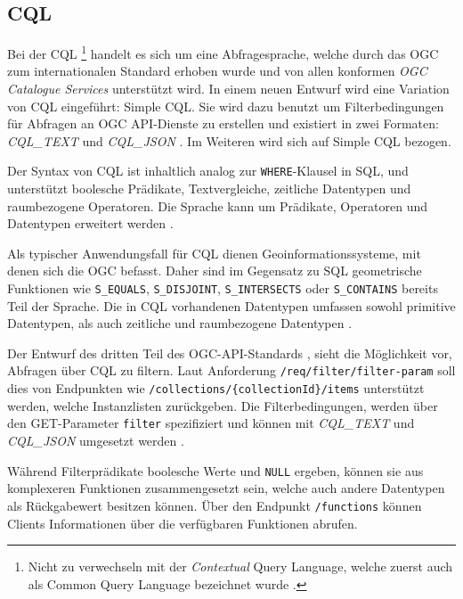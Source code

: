 \subsection{\acl{CQL}}

Bei der \acf{CQL} \footnote{Nicht zu verwechseln mit der \textit{Contextual} Query Language, welche zuerst auch als Common Query Language bezeichnet wurde \parencite{thelibraryofcongressCQLContextual2023, ZINGGentle2003}.} handelt es sich um eine Abfragesprache, welche durch das \ac{OGC} zum internationalen Standard erhoben wurde und von allen konformen \textit{\ac{OGC} Catalogue Services} unterstützt wird.  In einem neuen Entwurf  wird eine Variation von \ac{CQL} eingeführt: Simple \ac{CQL}. Sie wird dazu benutzt um Filterbedingungen für Abfragen an \ac{OGC} API-Dienste zu erstellen und existiert in zwei Formaten: \textit{CQL\_TEXT} und \textit{CQL\_JSON} . Im Weiteren wird sich auf Simple \ac{CQL} bezogen.

Der Syntax von \ac{CQL} ist inhaltlich analog zur \texttt{WHERE}-Klausel in \acs{SQL}, und unterstützt boolesche Prädikate, Textvergleiche, zeitliche Datentypen und raumbezogene Operatoren. Die Sprache kann um Prädikate, Operatoren und Datentypen erweitert werden .

Als typischer Anwendungsfall für \ac{CQL} dienen Geoinformationssysteme, mit denen sich die \ac{OGC} befasst. Daher sind im Gegensatz zu \ac{SQL} geometrische Funktionen wie \texttt{S\_EQUALS}, \texttt{S\_DISJOINT}, \texttt{S\_INTERSECTS} oder \texttt{S\_CONTAINS} bereits Teil der Sprache. Die in \ac{CQL} vorhandenen Datentypen umfassen sowohl primitive Datentypen, als auch zeitliche und raumbezogene Datentypen .

Der Entwurf des dritten Teil des OGC-API-Standards , sieht die Möglichkeit vor, Abfragen über \ac{CQL} zu filtern. Laut Anforderung \texttt{/req/filter/filter-param} soll dies von Endpunkten wie \texttt{/collections/\{collectionId\}/items} unterstützt werden, welche Instanzlisten zurückgeben. Die Filterbedingungen, werden über den GET-Parameter \texttt{filter} spezifiziert und können mit \textit{CQL\_TEXT} und \textit{CQL\_JSON} umgesetzt werden .

Während Filterprädikate boolesche Werte und \texttt{NULL} ergeben, können sie aus komplexeren Funktionen zusammengesetzt sein, welche auch andere Datentypen als Rückgabewert besitzen können. Über den Endpunkt \texttt{/functions} können Clients Informationen über die verfügbaren Funktionen abrufen.
